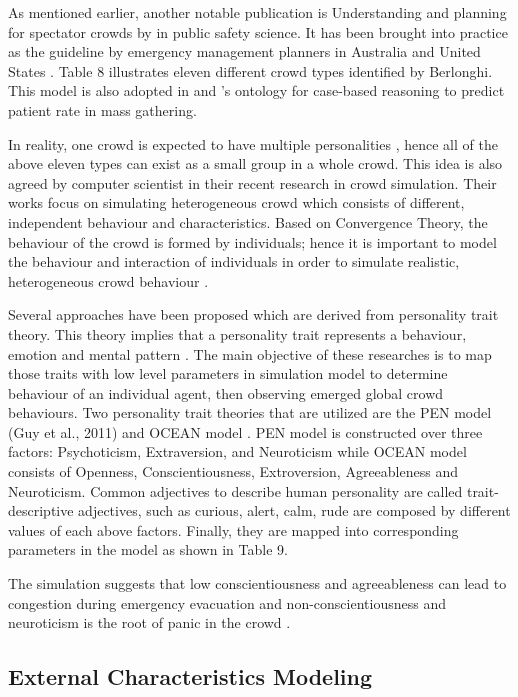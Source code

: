 As mentioned earlier, another notable publication is Understanding and planning for spectator crowds by \citet{Berlonghi1995} in public safety science. It has been brought into practice as the guideline by emergency management planners in Australia \citep{EMA1999} and United States \citep{FEMA2005}. Table 8 illustrates eleven different crowd types identified by Berlonghi. This model is also adopted in \citet{DelirHaghighi2013a} and \citet{Arbon2007}’s ontology for case-based reasoning to predict patient rate in mass gathering.

In reality, one crowd is expected to have multiple personalities \citep{Berlonghi1995}, hence all of the above eleven types can exist as a small group in a whole crowd. This idea is also agreed by computer scientist in their recent research in crowd simulation. Their works focus on simulating heterogeneous crowd which consists of different, independent behaviour and characteristics. Based on Convergence Theory, the behaviour of the crowd is formed by individuals; hence it is important to model the behaviour and interaction of individuals in order to simulate realistic, heterogeneous crowd behaviour \citep{Guy2011}.

Several approaches have been proposed which are derived from personality trait theory. This theory implies that a personality trait represents a behaviour, emotion and mental pattern \citep{Durupinar2008}. The main objective of these researches is to map those traits with low level parameters in simulation model to determine behaviour of an individual agent, then observing emerged global crowd behaviours. Two personality trait theories that are utilized are the PEN model (Guy et al., 2011) and OCEAN model \citep{Durupinar2008,Durupinar2011}. PEN model is constructed over three factors: Psychoticism, Extraversion, and Neuroticism while OCEAN model consists of Openness, Conscientiousness, Extroversion, Agreeableness and Neuroticism. Common adjectives to describe human personality are called trait-descriptive adjectives, such as curious, alert, calm, rude are composed by different values of each above factors. Finally, they are mapped into corresponding parameters in the model as shown in Table 9.

The simulation suggests that low conscientiousness and agreeableness can lead to congestion during emergency evacuation and non-conscientiousness and neuroticism is the root of panic in the crowd \citep{Durupinar2008}.

\subsection{External Characteristics Modeling}

